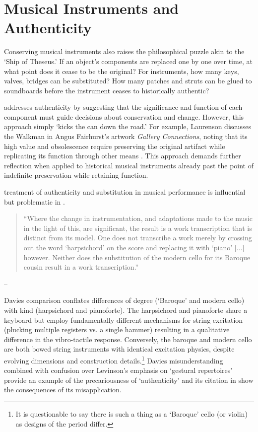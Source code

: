 \section{Musical Instruments and Authenticity}

Conserving musical instruments also raises the philosophical puzzle akin to the `Ship of Theseus.' If an object’s components are replaced one by one over time, at what point does it cease to be the original? For instruments, how many keys, valves, bridges can be substituted? How many patches and struts can be glued to soundboards before the instrument ceases to historically authentic?

\textcite{laurenson_authenticity_2006} addresses authenticity by suggesting that the significance and function of each component must guide decisions about conservation and change. However, this approach simply  `kicks the can down the road.’ For example, Laurenson discusses the Walkman in Angus Fairhurst’s artwork \textit{Gallery Connections}, noting that its high value and obsolescence require preserving the original artifact while replicating its function through other means \cite{laurenson_management_2005}. This approach demands further reflection when applied to historical musical instruments already past the point of indefinite preservation while retaining function.

\textcite{davies_authenticity_2001} treatment of authenticity and substitution in musical performance is influential but problematic in \cite{laurenson_authenticity_2006}. 

\begin{quotation}
    ``Where the change in instrumentation, and adaptations made to the music in the light of this, are significant, the result is a work transcription that is distinct from its model. One does not transcribe a work merely by crossing out the word ‘harpsichord’ on the score and replacing it with ‘piano’ [...] however. Neither does the substitution of the modern cello for its Baroque cousin result in a work transcription.''
\end{quotation}
\begin{flushright}
-- \cite[p. 222]{davies_authenticity_2001}
\end{flushright}

Davies comparison conflates differences of degree (`Baroque' and modern cello) with kind (harpsichord and pianoforte). The harpsichord and pianoforte share a keyboard but employ fundamentally different mechanisms for string excitation (plucking multiple registers vs. a single hammer) resulting in a qualitative difference in the vibro-tactile response. Conversely, the baroque and modern cello are both bowed string instruments with identical excitation physics, despite evolving dimensions and construction details.\footnote{It is questionable to say there is such a thing as a `Baroque' cello (or violin) as designs of the period differ.} Davies misunderstanding combined with confusion over Levinson's emphasis on `gestural repertoires' \cite{levinson_music_1990} provide an example of the precariousness of `authenticity' and its citation in \cite{laurenson_authenticity_2006} show the consequences of its misapplication.

